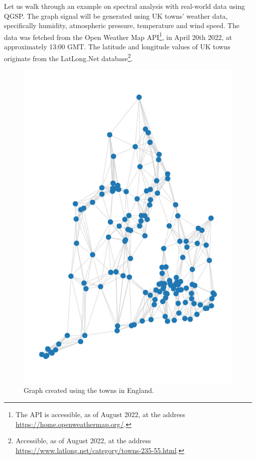 Let us walk through an example on spectral analysis with real-world data using QGSP. The graph signal will be generated using UK towns' weather data, specifically humidity, atmospheric pressure, temperature and wind speed. The data was fetched from the Open Weather Map API\footnote{The API is accessible, as of August 2022, at the address \url{https://home.openweathermap.org/}.}, in April 20th 2022, at approximately 13:00 GMT. The latitude and longitude values of UK towns originate from the LatLong.Net database\footnote{Accessible, as of August 2022, at the address \url{https://www.latlong.net/category/towns-235-55.html}.}.

\begin{figure}
	\centering
	\includegraphics[width=0.3\linewidth]{thesis/Figures/uk_qgsp_graph.pdf}
	\caption{Graph created using the towns in England.}
	\label{fig:uk_graph}
\end{figure}


